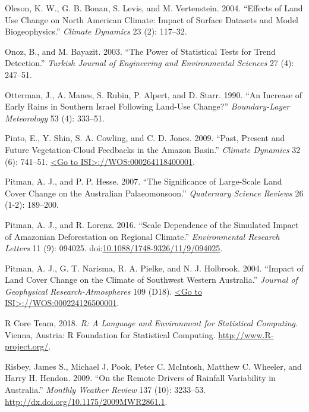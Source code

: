 \documentclass[fleqn,10pt,lineno]{wlpeerj} %
\begin{document}
\hypertarget{ref-Oleson2004}{}
Oleson, K. W., G. B. Bonan, S. Levis, and M. Vertenstein. 2004.
``Effects of Land Use Change on North American Climate: Impact of
Surface Datasets and Model Biogeophysics.'' \emph{Climate Dynamics} 23
(2): 117--32.

\hypertarget{ref-Onoz2003}{}
Onoz, B., and M. Bayazit. 2003. ``The Power of Statistical Tests for
Trend Detection.'' \emph{Turkish Journal of Engineering and
Environmental Sciences} 27 (4): 247--51.

\hypertarget{ref-Otterman1990}{}
Otterman, J., A. Manes, S. Rubin, P. Alpert, and D. Starr. 1990. ``An
Increase of Early Rains in Southern Israel Following Land-Use Change?''
\emph{Boundary-Layer Meteorology} 53 (4): 333--51.

\hypertarget{ref-Pinto2009}{}
Pinto, E., Y. Shin, S. A. Cowling, and C. D. Jones. 2009. ``Past,
Present and Future Vegetation-Cloud Feedbacks in the Amazon Basin.''
\emph{Climate Dynamics} 32 (6): 741--51.
\href{\%3CGo\%20to\%20ISI\%3E://WOS:000264118400001}{\textless{}Go to ISI\textgreater{}://WOS:000264118400001}.

\hypertarget{ref-Pitman2007}{}
Pitman, A. J., and P. P. Hesse. 2007. ``The Significance of Large-Scale
Land Cover Change on the Australian Palaeomonsoon.'' \emph{Quaternary
Science Reviews} 26 (1-2): 189--200.

\hypertarget{ref-pitman_scale_2016}{}
Pitman, A. J., and R. Lorenz. 2016. ``Scale Dependence of the Simulated
Impact of Amazonian Deforestation on Regional Climate.''
\emph{Environmental Research Letters} 11 (9): 094025.
doi:\href{https://doi.org/10.1088/1748-9326/11/9/094025}{10.1088/1748-9326/11/9/094025}.

\hypertarget{ref-Pitman2004}{}
Pitman, A. J., G. T. Narisma, R. A. Pielke, and N. J. Holbrook. 2004.
``Impact of Land Cover Change on the Climate of Southwest Western
Australia.'' \emph{Journal of Geophysical Research-Atmospheres} 109
(D18).
\href{\%3CGo\%20to\%20ISI\%3E://WOS:000224126500001}{\textless{}Go to ISI\textgreater{}://WOS:000224126500001}.

\hypertarget{ref-Rstats2018}{}
R Core Team, 2018. \emph{R: A Language and Environment for Statistical
Computing}. Vienna, Austria: R Foundation for Statistical Computing.
\url{http://www.R-project.org/}.

\hypertarget{ref-Risbey2009}{}
Risbey, James S., Michael J. Pook, Peter C. McIntosh, Matthew C.
Wheeler, and Harry H. Hendon. 2009. ``On the Remote Drivers of Rainfall
Variability in Australia.'' \emph{Monthly Weather Review} 137 (10):
3233--53. \url{http://dx.doi.org/10.1175/2009MWR2861.1}.
\end{document}
